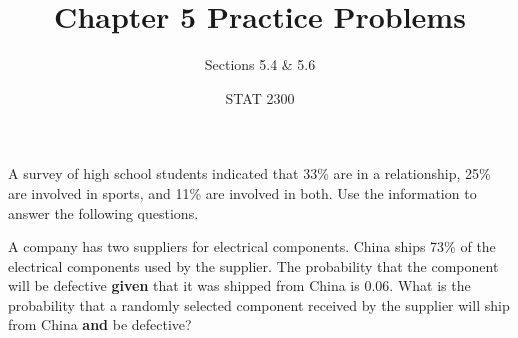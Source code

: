 \documentclass[noanswers]{exam}
\title{Chapter 5 Practice Problems}
\author{Sections 5.4 \& 5.6}
\date{STAT 2300}
\begin{document}
%

\begin{questions} 
		
	\question A survey of high school students indicated that 33\% are in a relationship, 25\% are involved in sports, and 11\% are involved in both. Use the information to answer the following questions.

\vspace{3mm}


\question A company has two suppliers for electrical components. China ships 73\% of the electrical components used by the supplier. The probability that the component will be defective \textbf{given} that it was shipped from China is 0.06. What is the probability that a randomly selected component received by the supplier will ship from China \textbf{and} be defective?


\end{questions}
\end{document}
